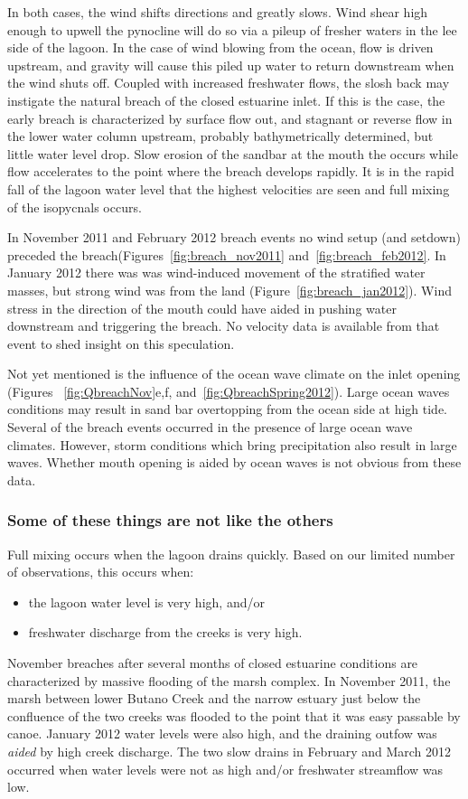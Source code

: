 In both cases, the wind shifts directions and greatly slows. Wind shear high enough to upwell the pynocline will do so via a pileup of fresher waters in the lee side of the lagoon. In the case of wind blowing from the ocean, flow is driven upstream, and gravity will cause this piled up water to return downstream when the wind shuts off. Coupled with increased freshwater flows, the slosh back may instigate the natural breach of the closed estuarine inlet. 
If this is the case, the early breach is characterized by surface flow out, and stagnant or reverse flow in the lower water column upstream, probably bathymetrically determined, but little water level drop. Slow erosion of the sandbar at the mouth the occurs while flow accelerates to the point where the breach develops rapidly. It is in the rapid fall of the lagoon water level that the highest velocities are seen and full mixing of the isopycnals occurs. 

In November 2011 and February 2012 breach events no wind setup (and setdown) preceded the breach(Figures~\ref{fig:breach_nov2011} and~\ref{fig:breach_feb2012}. In January 2012 there was was wind-induced movement of the stratified water masses, but strong wind was from the land (Figure~\ref{fig:breach_jan2012}). Wind stress in the direction of the mouth could have aided in pushing water downstream and triggering the breach. No velocity data is available from that event to shed insight on this speculation.

Not yet mentioned is the influence of the ocean wave climate on the inlet opening (Figures ~\ref{fig:QbreachNov}e,f, and~\ref{fig:QbreachSpring2012}). Large ocean waves conditions may result in sand bar overtopping from the ocean side at high tide. Several of the breach events occurred in the presence of large ocean wave climates. However, storm conditions which bring precipitation also result in large waves. Whether mouth opening is aided by ocean waves is not obvious from these data. 

\subsubsection{Some of these things are not like the others}

Full mixing occurs when the lagoon drains quickly. Based on our limited number of observations, this occurs when:
\begin{itemize}
	\item the lagoon water level is very high, and/or
	\item freshwater discharge from the creeks is very high.
\end{itemize}
November breaches after several months of closed estuarine conditions are characterized by massive flooding of the marsh complex. In November 2011, the marsh between lower Butano Creek and the narrow estuary just below the confluence of the two creeks was flooded to the point that it was easy passable by canoe. January 2012 water levels were also high, and the draining outfow was \emph{aided} by high creek discharge. The two slow drains in February and March 2012 occurred when water levels were not as high and/or freshwater streamflow was low.

